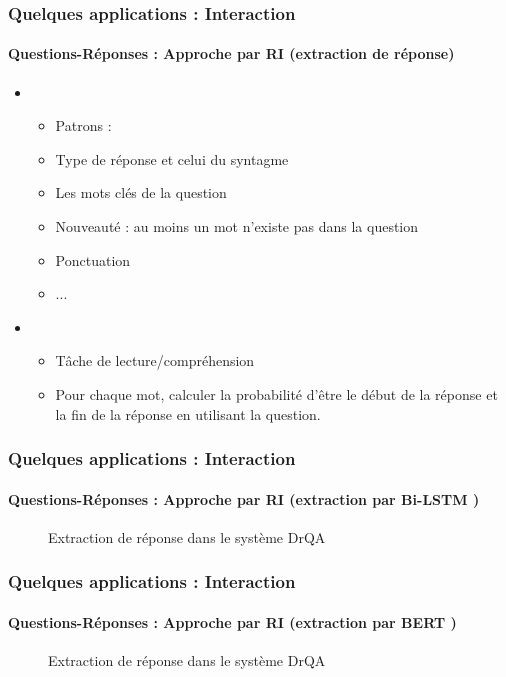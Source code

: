 \documentclass[xcolor=table]{beamer}
\begin{document}
\begin{frame}
	\frametitle{Quelques applications : Interaction}
	\framesubtitle{Questions-Réponses : Approche par RI (extraction de réponse)}
	
	\begin{itemize}
		\item {}
		\begin{itemize}
			\item Patrons : 
			\item Type de réponse et celui du syntagme
			\item Les mots clés de la question
			\item Nouveauté : au moins un mot n'existe pas dans la question
			\item Ponctuation
			\item ...
		\end{itemize}
		\item {}
		\begin{itemize}
			\item Tâche de lecture/compréhension
			\item Pour chaque mot, calculer la probabilité d'être le début de la réponse et la fin de la réponse en utilisant la question. 
		\end{itemize}
	\end{itemize}
	
\end{frame}

\begin{frame}
	\frametitle{Quelques applications : Interaction}
	\framesubtitle{Questions-Réponses : Approche par RI (extraction par Bi-LSTM \cite{2017-chen-al})}
	
	\begin{figure}
		\caption{Extraction de réponse dans le système DrQA \cite{2019-jurafsky-martin}}
	\end{figure}
	
\end{frame}

\begin{frame}
	\frametitle{Quelques applications : Interaction}
	\framesubtitle{Questions-Réponses : Approche par RI (extraction par BERT \cite{2018-devlin-al})}
	
	\begin{figure}
		\centering
		\caption{Extraction de réponse dans le système DrQA \cite{2019-jurafsky-martin}}
	\end{figure}
	
\end{frame}
\end{document}
